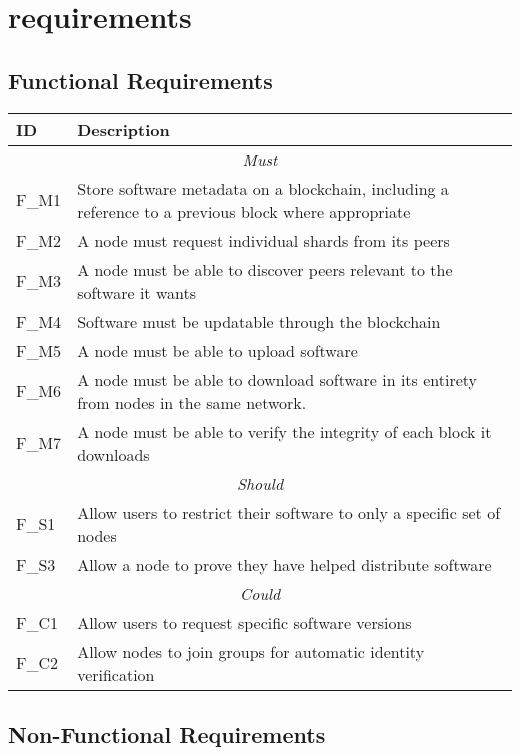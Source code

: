 
\section{requirements}

\subsection{Functional Requirements}

\begin{longtable}{ p{} p{} }
  \toprule
  \textbf{ID} & \textbf{Description}
  \\\midrule\midrule
  \multicolumn{2}{c}{\cellcolor{red!70}\textit{Must}}\\\midrule
  F\_M1 & Store software metadata on a blockchain, including a reference to a previous block where appropriate\\
  F\_M2 & A node must request individual shards from its peers\\
  F\_M3 & A node must be able to discover peers relevant to the software it wants\\
  F\_M4 & Software must be updatable through the blockchain\\
  F\_M5 & A node must be able to upload software\\
  F\_M6 & A node must be able to download software in its entirety from nodes in the same network.\\
  F\_M7 & A node must be able to verify the integrity of each block it downloads\\
  \midrule\multicolumn{2}{c}{\cellcolor{orange!70}\textit{Should}}\\\midrule
  F\_S1 & Allow users to restrict their software to only a specific set of nodes\\
  F\_S3 & Allow a node to prove they have helped distribute software\\
  \midrule\multicolumn{2}{c}{\cellcolor{green}\textit{Could}}\\\midrule
  F\_C1 & Allow users to request specific software versions\\
  F\_C2 & Allow nodes to join groups for automatic identity verification\\
  \midrule
  \bottomrule
\end{longtable}

\subsection{Non-Functional Requirements}

